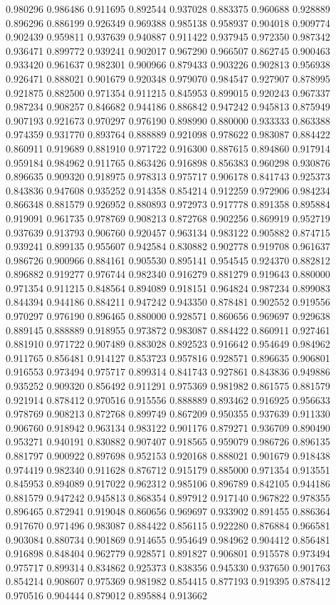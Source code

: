 0.980296
0.986486
0.911695
0.892544
0.937028
0.883375
0.960688
0.928889
0.896296
0.886199
0.926349
0.969388
0.985138
0.958937
0.904018
0.909774
0.902439
0.959811
0.937639
0.940887
0.911422
0.937945
0.972350
0.987342
0.936471
0.899772
0.939241
0.902017
0.967290
0.966507
0.862745
0.900463
0.933420
0.961637
0.982301
0.900966
0.879433
0.903226
0.902813
0.956938
0.926471
0.888021
0.901679
0.920348
0.979070
0.984547
0.927907
0.878995
0.921875
0.882500
0.971354
0.911215
0.845953
0.899015
0.920243
0.967337
0.987234
0.908257
0.846682
0.944186
0.886842
0.947242
0.945813
0.875949
0.907193
0.921673
0.970297
0.976190
0.898990
0.880000
0.933333
0.863388
0.974359
0.931770
0.893764
0.888889
0.921098
0.978622
0.983087
0.884422
0.860911
0.919689
0.881910
0.971722
0.916300
0.887615
0.894860
0.917914
0.959184
0.984962
0.911765
0.863426
0.916898
0.856383
0.960298
0.930876
0.896635
0.909320
0.918975
0.978313
0.975717
0.906178
0.841743
0.925373
0.843836
0.947608
0.935252
0.914358
0.854214
0.912259
0.972906
0.984234
0.866348
0.881579
0.926952
0.880893
0.972973
0.917778
0.891358
0.895884
0.919091
0.961735
0.978769
0.908213
0.872768
0.902256
0.869919
0.952719
0.937639
0.913793
0.906760
0.920457
0.963134
0.983122
0.905882
0.874715
0.939241
0.899135
0.955607
0.942584
0.830882
0.902778
0.919708
0.961637
0.986726
0.900966
0.884161
0.905530
0.895141
0.954545
0.924370
0.882812
0.896882
0.919277
0.976744
0.982340
0.916279
0.881279
0.919643
0.880000
0.971354
0.911215
0.848564
0.894089
0.918151
0.964824
0.987234
0.899083
0.844394
0.944186
0.884211
0.947242
0.943350
0.878481
0.902552
0.919556
0.970297
0.976190
0.896465
0.880000
0.928571
0.860656
0.969697
0.929638
0.889145
0.888889
0.918955
0.973872
0.983087
0.884422
0.860911
0.927461
0.881910
0.971722
0.907489
0.883028
0.892523
0.916642
0.954649
0.984962
0.911765
0.856481
0.914127
0.853723
0.957816
0.928571
0.896635
0.906801
0.916553
0.973494
0.975717
0.899314
0.841743
0.927861
0.843836
0.949886
0.935252
0.909320
0.856492
0.911291
0.975369
0.981982
0.861575
0.881579
0.921914
0.878412
0.970516
0.915556
0.888889
0.893462
0.916925
0.956633
0.978769
0.908213
0.872768
0.899749
0.867209
0.950355
0.937639
0.911330
0.906760
0.918942
0.963134
0.983122
0.901176
0.879271
0.936709
0.890490
0.953271
0.940191
0.830882
0.907407
0.918565
0.959079
0.986726
0.896135
0.881797
0.900922
0.897698
0.952153
0.920168
0.888021
0.901679
0.918438
0.974419
0.982340
0.911628
0.876712
0.915179
0.885000
0.971354
0.913551
0.845953
0.894089
0.917022
0.962312
0.985106
0.896789
0.842105
0.944186
0.881579
0.947242
0.945813
0.868354
0.897912
0.917140
0.967822
0.978355
0.896465
0.872941
0.919048
0.860656
0.969697
0.933902
0.891455
0.886364
0.917670
0.971496
0.983087
0.884422
0.856115
0.922280
0.876884
0.966581
0.903084
0.880734
0.901869
0.914655
0.954649
0.984962
0.904412
0.856481
0.916898
0.848404
0.962779
0.928571
0.891827
0.906801
0.915578
0.973494
0.975717
0.899314
0.834862
0.925373
0.838356
0.945330
0.937650
0.901763
0.854214
0.908607
0.975369
0.981982
0.854415
0.877193
0.919395
0.878412
0.970516
0.904444
0.879012
0.895884
0.913662
